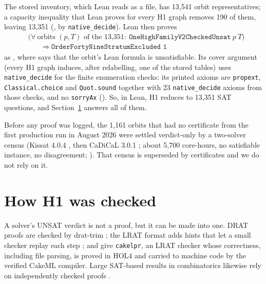 \documentclass{anvil-paper}
\newcommand{\repobase}{https://github.com/rjwalters/lean-genius/blob/fa2b41268df024128ed4738b3bb500637cf1ec12}
\newcommand{\repofile}[2]{\href{\repobase/#1}{\lean{#2}}}
\newcommand{\rp}{research/problems/erdos-85-wip-01}
\newcommand{\cakelpr}{\texttt{cake\textunderscore lpr}}
\theoremstyle{definition}
\begin{document}
The stored inventory, which Lean reads as a file, has 13,541 orbit representatives; a capacity inequality that Lean proves for every H1 graph removes 190 of them, leaving 13,351 (, by \texttt{native\_decide}). Lean then proves
\[
\begin{aligned}
&\bigl(\forall\ \text{orbits } (p,T) \text{ of the 13,351}:\ \texttt{OneHighFamilyV2CheckedUnsat}\ p\ T\bigr)\\
&\qquad\Longrightarrow\ \texttt{OrderFortyNineStratumExcluded 1}
\end{aligned}
\]
as , where  says that the orbit's Lean formula is unsatisfiable. Its cover argument (every H1 graph induces, after relabelling, one of the stored tables) uses \texttt{native\_decide} for the finite enumeration checks: its printed axioms are \texttt{propext}, \texttt{Classical.choice} and \texttt{Quot.sound} together with 23 \texttt{native\_decide} axioms from those checks, and no \texttt{sorryAx} (\repofile{\rp/h1_cert_pilot_20261001/H1_COVER_AXIOMS_20261006.txt}{H1_COVER_AXIOMS_20261006.txt}). So, in Lean, H1 reduces to 13,351 SAT questions, and Section~\ref{sec:h1} answers all of them.

Before any proof was logged, the 1,161 orbits that had no certificate from the first production run in August 2026 were settled verdict-only by a two-solver census (Kissat 4.0.4 \citep{biere2024kissat}, then CaDiCaL 3.0.1 \citep{biere2020cadical,biere2024cadical2}; about 5,700 core-hours, no satisfiable instance, no disagreement; \repofile{\rp/phase_b_h1_census_20260927/CENSUS.md}{CENSUS.md}). That census is superseded by certificates and we do not rely on it.

\section{How H1 was checked}\label{sec:h1}

A solver's UNSAT verdict is not a proof, but it can be made into one. DRAT proofs are checked by drat-trim \citep{wetzler2014drat}; the LRAT format adds hints that let a small checker replay each step \citep{cruzfilipe2017lrat}; and \citet{tan2021cakelpr} give \cakelpr{}, an LRAT checker whose correctness, including file parsing, is proved in HOL4 and carried to machine code by the verified CakeML compiler. Large SAT-based results in combinatorics likewise rely on independently checked proofs \citep{heule2016pythagorean,heule2018schur}.
\end{document}
